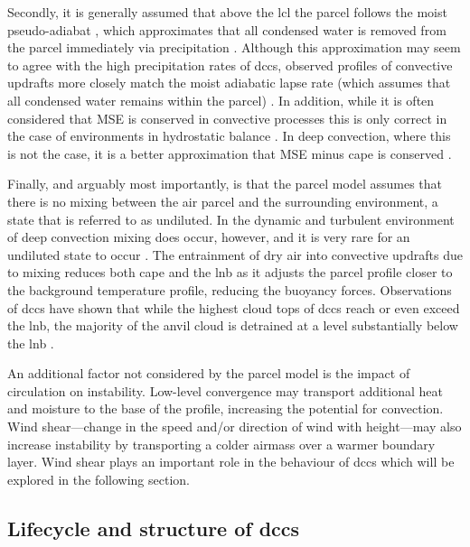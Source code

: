 Secondly, it is generally assumed that above the \acrshort{lcl} the parcel follows the moist pseudo-adiabat \citep{peters_generalized_2022}, which approximates that all condensed water is removed from the parcel immediately via precipitation \citep{emanuel_atmospheric_1994}. 
Although this approximation may seem to agree with the high precipitation rates of \acrshort{dcc}s, observed profiles of convective updrafts more closely match the moist adiabatic lapse rate (which assumes that all condensed water remains within the parcel) \citep{xu_is_1989}. 
In addition, while it is often considered that MSE is conserved in convective processes this is only correct in the case of environments in hydrostatic balance \citep{peters_evaluating_2021}. 
In deep convection, where this is not the case, it is a better approximation that MSE minus \acrshort{cape} is conserved \citep{romps_mse_2015}.

Finally, and arguably most importantly, is that the parcel model assumes that there is no mixing between the air parcel and the surrounding environment, a state that is referred to as undiluted. 
In the dynamic and turbulent environment of deep convection mixing does occur, however, and it is very rare for an undiluted state to occur \citep{romps_undiluted_2010}. 
The entrainment of dry air into convective updrafts due to mixing reduces both \acrshort{cape} \citep{zhang_effects_2009} and the \acrshort{lnb} \citep{masunaga_convective_2016} as it adjusts the parcel profile closer to the background temperature profile, reducing the buoyancy forces. 
Observations of \acrshort{dcc}s have shown that while the highest cloud tops of \acrshort{dcc}s reach or even exceed the \acrshort{lnb}, the majority of the anvil cloud is detrained at a level substantially below the \acrshort{lnb} \citep{takahashi_where_2012, takahashi_level_2017}.

An additional factor not considered by the parcel model is the impact of circulation on instability.
Low-level convergence may transport additional heat and moisture to the base of the profile, increasing the potential for convection.
Wind shear---change in the speed and/or direction of wind with height---may also increase instability by transporting a colder airmass over a warmer boundary layer.
Wind shear plays an important role in the behaviour of \acrshort{dcc}s which will be explored in the following section.


\subsection{Lifecycle and structure of \acrshort{dcc}s}

